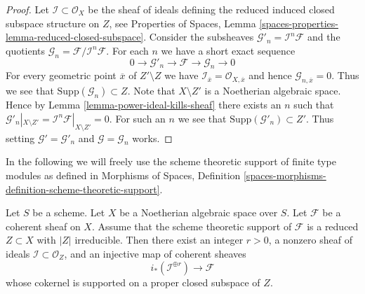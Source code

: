 \begin{proof}
Let $\mathcal{I} \subset \mathcal{O}_X$ be the sheaf of ideals
defining the reduced induced closed subspace structure on $Z$, see
Properties of Spaces, Lemma
\ref{spaces-properties-lemma-reduced-closed-subspace}.
Consider the subsheaves
$\mathcal{G}'_n = \mathcal{I}^n\mathcal{F}$ and the
quotients $\mathcal{G}_n = \mathcal{F}/\mathcal{I}^n\mathcal{F}$.
For each $n$ we have a short exact sequence
$$
0 \to \mathcal{G}'_n \to \mathcal{F} \to \mathcal{G}_n \to 0
$$
For every geometric point $\overline{x}$ of $Z' \setminus Z$ we have
$\mathcal{I}_{\overline{x}} = \mathcal{O}_{X, \overline{x}}$
and hence $\mathcal{G}_{n, \overline{x}} = 0$. Thus we see that
$\text{Supp}(\mathcal{G}_n) \subset Z$. Note that $X \setminus Z'$
is a Noetherian algebraic space. Hence by
Lemma \ref{lemma-power-ideal-kills-sheaf}
there exists an $n$ such that $\mathcal{G}'_n|_{X \setminus Z'} =
\mathcal{I}^n\mathcal{F}|_{X \setminus Z'} = 0$.
For such an $n$ we see that $\text{Supp}(\mathcal{G}'_n) \subset Z'$.
Thus setting $\mathcal{G}' = \mathcal{G}'_n$ and $\mathcal{G} = \mathcal{G}_n$
works.
\end{proof}

\noindent
In the following we will freely use the scheme theoretic support of
finite type modules as defined in Morphisms of Spaces, Definition
\ref{spaces-morphisms-definition-scheme-theoretic-support}.

\begin{lemma}
\label{lemma-prepare-filter-irreducible}
Let $S$ be a scheme. Let $X$ be a Noetherian algebraic space over $S$.
Let $\mathcal{F}$ be a coherent sheaf on $X$. Assume that the scheme
theoretic support of $\mathcal{F}$ is a reduced $Z \subset X$ with
$|Z|$ irreducible. Then there exist an integer $r > 0$, a nonzero
sheaf of ideals $\mathcal{I} \subset \mathcal{O}_Z$, and an injective
map of coherent sheaves
$$
i_*\left(\mathcal{I}^{\oplus r}\right) \to \mathcal{F}
$$
whose cokernel is supported on a proper closed subspace of $Z$.
\end{lemma}


